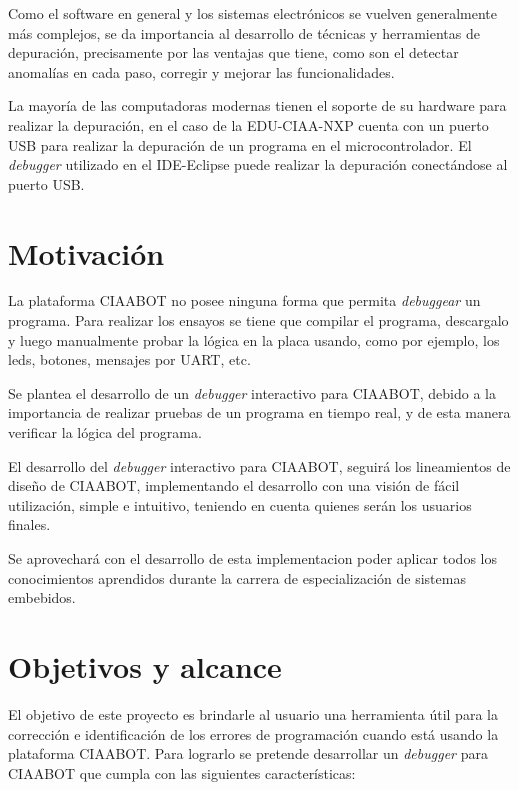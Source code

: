 Como el software en general y los sistemas electrónicos se vuelven generalmente
más complejos, se da importancia al desarrollo de técnicas y herramientas de depuración,
precisamente por las ventajas que tiene, como son el detectar anomalías
en cada paso, corregir y mejorar las funcionalidades. 

La mayoría de las computadoras modernas tienen el soporte de su hardware para
realizar la depuración, en el caso de la EDU-CIAA-NXP cuenta con un puerto USB
para realizar la depuración de un programa en el microcontrolador. El \emph{debugger}
utilizado en el IDE-Eclipse puede realizar la depuración conectándose al puerto
USB.


\section{Motivación}
\label{Motivación}

La plataforma CIAABOT no posee ninguna forma que permita \emph{debuggear} un programa.
Para realizar los ensayos se tiene que compilar el programa, descargalo y luego manualmente probar la lógica en la placa usando, como por ejemplo, los leds, botones, mensajes por UART, etc.

Se plantea el desarrollo de un \emph{debugger} interactivo para CIAABOT, debido a la
importancia de realizar pruebas de un programa en tiempo real, y de esta manera verificar la lógica del programa.

El desarrollo del \emph{debugger} interactivo para CIAABOT, seguirá los lineamientos
de diseño de CIAABOT, implementando el desarrollo con una visión de
fácil utilización, simple e intuitivo, teniendo en cuenta quienes serán los usuarios
finales.

Se aprovechará con el desarrollo de esta implementacion poder aplicar todos los
conocimientos aprendidos durante la carrera de especialización de sistemas embebidos.



\section{Objetivos y alcance}
\label{Objetivos y alcance}

El objetivo de este proyecto es brindarle al usuario una herramienta útil para la
corrección e identificación de los errores de programación cuando está usando
la plataforma CIAABOT. Para lograrlo se pretende desarrollar un \emph{debugger} para
CIAABOT que cumpla con las siguientes características: 

